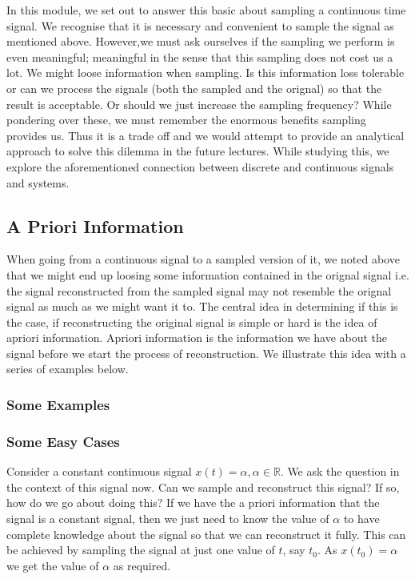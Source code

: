 In this module, we set out to answer this basic about sampling a continuous time signal. We recognise that it is necessary and convenient to sample the signal as mentioned above. However,we must ask ourselves if the sampling we perform is even meaningful; meaningful in the sense that this sampling does not cost us a lot. We might loose information when sampling. Is this information loss tolerable or can we process the signals (both the sampled and the orignal) so that the result is acceptable. Or should we just increase the sampling frequency? While pondering over these, we must remember the enormous benefits sampling provides us. Thus it is a trade off and we would attempt to provide an analytical approach to solve this dilemma in the future lectures. While studying this, we explore the aforementioned connection between discrete and continuous signals and systems.

\subsection{A Priori Information}
When going from a continuous signal to a sampled version of it, we noted above that we might end up loosing some information contained in the orignal signal i.e. the signal reconstructed from the sampled signal may not resemble the orignal signal as much as we might want it to. The central idea in determining if this is the case, if reconstructing the original signal is simple or hard is the idea of apriori information. Apriori information is the information we have about the signal before we start the process of reconstruction. We illustrate this idea with a series of examples below.\\

\subsubsection{Some Examples}
\subsubsection{Some Easy Cases}
Consider a constant continuous signal $x(t) = \alpha, \alpha \in \mathbb{R}$. We ask the question in the context of this signal now. Can we sample and reconstruct this signal? If so, how do we go about doing this? If we have the a priori information that the signal is a constant signal, then we just need to know the value of $\alpha$ to have complete knowledge about the signal so that we can reconstruct it fully. This can be achieved by sampling the signal at just one value of $t$, say $t_{0}$. As $x(t_{0}) = \alpha$ we get the value of $\alpha$ as required.\\

